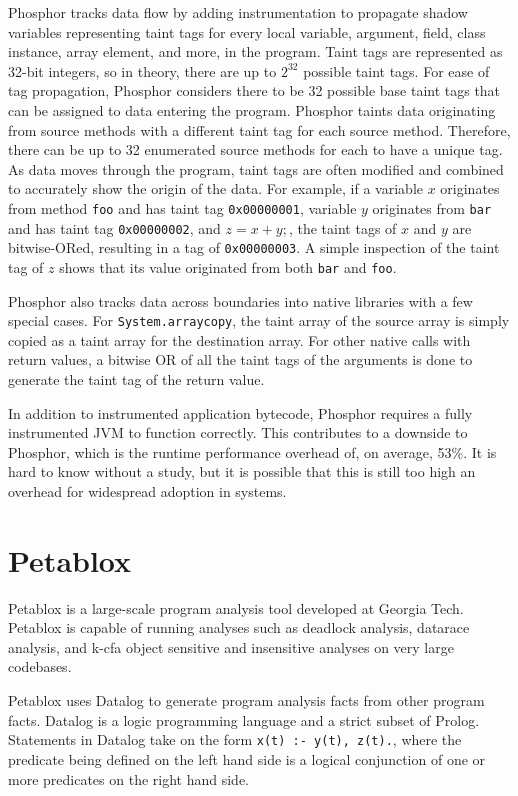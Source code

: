 Phosphor tracks data flow by adding instrumentation to propagate
shadow variables representing taint tags for every local variable,
argument, field, class instance, array element, and more, in the
program. Taint tags are represented as 32-bit integers, so in theory,
there are up to $2^{32}$ possible taint tags. For ease of tag
propagation, Phosphor considers there to be 32 possible base taint
tags that can be assigned to data entering the program. Phosphor
taints data originating from source methods with a different taint tag
for each source method. Therefore, there can be up to 32 enumerated
source methods for each to have a unique tag. As data moves through
the program, taint tags are often modified and combined to accurately
show the origin of the data. For example, if a variable $x$ originates
from method \texttt{foo} and has taint tag \texttt{0x00000001},
variable $y$ originates from \texttt{bar} and has taint tag
\texttt{0x00000002}, and $z = x + y;$, the taint tags of $x$ and $y$
are bitwise-ORed, resulting in a tag of \texttt{0x00000003}. A simple
inspection of the taint tag of $z$ shows that its value originated
from both \texttt{bar} and \texttt{foo}.

Phosphor also tracks data across boundaries into native libraries with
a few special cases. For \texttt{System.arraycopy}, the taint array of
the source array is simply copied as a taint array for the destination
array. For other native calls with return values, a bitwise OR of all
the taint tags of the arguments is done to generate the taint tag of
the return value.

In addition to instrumented application bytecode, Phosphor requires a
fully instrumented JVM to function correctly. This contributes to a
downside to Phosphor, which is the runtime performance overhead of, on
average, 53\%. It is hard to know without a study, but it is possible
that this is still too high an overhead for widespread adoption in
systems.
\section{Petablox}
Petablox \cite{petablox} is a large-scale program analysis tool
developed at Georgia Tech. Petablox is capable of running analyses
such as deadlock analysis, datarace analysis, and k-cfa object
sensitive and insensitive analyses on very large codebases.

Petablox uses Datalog \cite{datalog} to generate program analysis
facts from other program facts. Datalog is a logic programming
language and a strict subset of Prolog. Statements in Datalog take on
the form \texttt{x(t) :- y(t), z(t).}, where the predicate being
defined on the left hand side is a logical conjunction of one or more
predicates on the right hand side.


